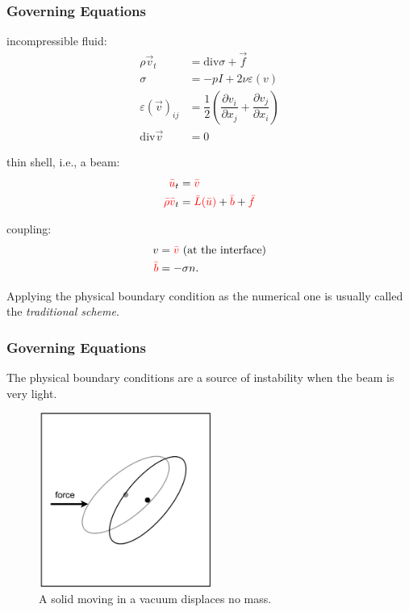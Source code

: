 \documentclass[8pt]{beamer}
\newcommand{\leftd}[1]{{\color{red} \bar{#1}}}
\newcommand{\leftdd}[2]{{\color{red} \bar{#1}(\bar{#2})}}
\newcommand{\divergence}{\mathrm{div}}
\begin{document}
\begin{frame}
    \frametitle{Governing Equations}
    incompressible fluid:
    \begin{align}
        \rho \vec{v}_t &= \divergence \sigma + \vec{f}                        \\
        \sigma &= -p I + 2 \nu \varepsilon(v)                                 \\
        \varepsilon(\vec{v})_{ij} &= \dfrac{1}{2}
        \left(
        \dfrac{\partial v_i}{\partial x_j} +
        \dfrac{\partial v_j}{\partial x_i}
        \right)                                                               \\
        \divergence \vec{v} &= 0
    \end{align}

    thin shell, i.e., a beam:
    \begin{align}
        \leftd{u}_t              &= \leftd{v}                                 \\
        \leftd{\rho} \leftd{v}_t &= \leftdd{L}{u} + \leftd{b} + \leftd{f}
    \end{align}

    \pause
    coupling:
    \begin{align}
        v &= \leftd{v} \text{ (at the interface)}                             \\
        \leftd{b} &= -\sigma n.
    \end{align}
    \pause

    Applying the physical boundary condition as the numerical one is usually
    called the \emph{traditional scheme}.
\end{frame}

\begin{frame}
    \frametitle{Governing Equations}
    The physical boundary conditions are a source of instability when the beam
    is very light.

    \begin{figure}
        \centering
        \includegraphics[width=2.25in]{left.png}

        \caption{A solid moving in a vacuum displaces no mass.}
    \end{figure}
\end{frame}
\end{document}

